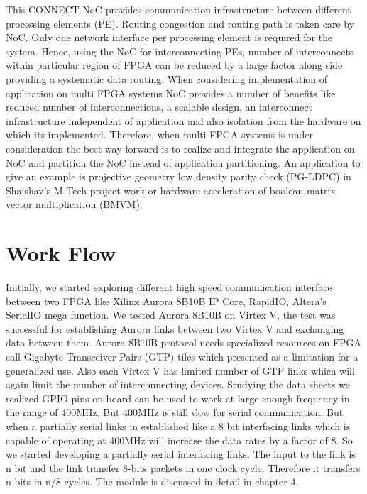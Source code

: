 This CONNECT NoC provides communication infrastructure between different processing elements (PE). Routing congestion and routing path is taken care by NoC. Only one network interface per processing element is required for the system. Hence, using the NoC for interconnecting PEs, number of interconnects within particular region of FPGA can be reduced by a large factor along side providing a systematic data routing. When considering implementation of application on multi FPGA systems NoC provides a number of benefits like reduced number of interconnections, a scalable design, an interconnect infrastructure independent of application and also isolation from the hardware on which its implemented. Therefore, when multi FPGA systems is under consideration the best way forward is to realize and integrate the application on NoC and partition the NoC instead of application partitioning. An application to give an example is projective geometry low density parity check (PG-LDPC) in Shaishav’s M-Tech project work or hardware acceleration of boolean matrix vector multiplication (BMVM).

\section {Work Flow}

Initially, we started exploring different high speed communication interface between two FPGA like Xilinx Aurora 8B10B IP Core, RapidIO, Altera's SerialIO mega function. We tested Aurora 8B10B on Virtex V, the test was successful for establishing Aurora links between two Virtex V and exchanging data between them. Aurora 8B10B protocol needs specialized resources on FPGA call Gigabyte Transceiver Pairs (GTP) tiles which presented as a limitation for a generalized use. Also each Virtex V has limited number of GTP links which will again limit the number of interconnecting devices. Studying the data sheets we realized GPIO pins on-board can be used to work at large enough frequency in the range of 400MHz. But 400MHz is still slow for serial communication. But when a partially serial links in established like a 8 bit interfacing links which is capable of operating at 400MHz will increase the data rates by a factor of 8. So we started developing a partially serial interfacing links. The input to the link is n bit and the link transfer 8-bits packets in one clock cycle. Therefore it transfers n bits in n/8 cycles. The module is discussed in detail in chapter 4.\\

